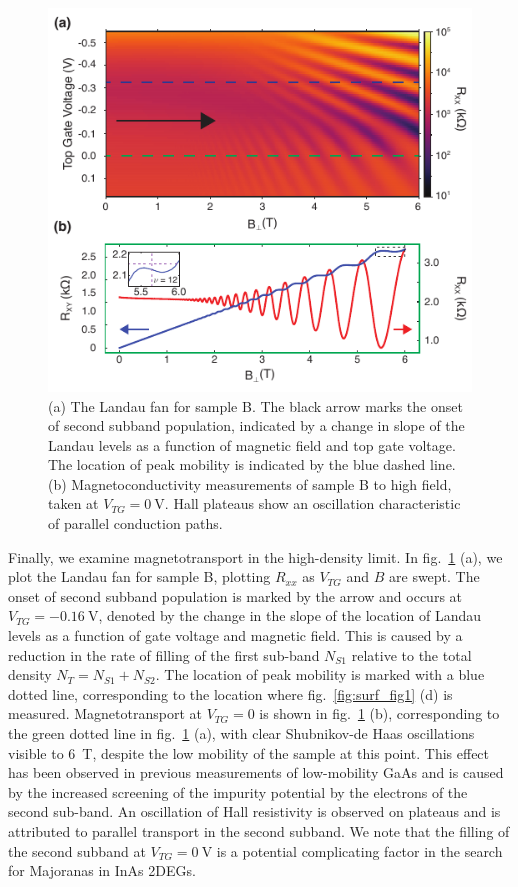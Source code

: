 \begin{figure}
    \includegraphics[width=0.6\linewidth]{Figure5}
    \caption{\label{fig:surf_fig5}(a) The Landau fan for sample B. The black arrow marks the onset of second subband population, indicated by a change in slope of the Landau levels as a function of magnetic field and top gate voltage. The location of peak mobility is indicated by the blue dashed line. (b) Magnetoconductivity measurements of sample B to high field, taken at $V_{TG} = \SI{0}{\volt}$. Hall plateaus show an oscillation characteristic of parallel conduction paths.}
\end{figure}

Finally, we examine magnetotransport in the high-density limit. In fig.~\ref{fig:surf_fig5} (a), we plot the Landau fan for sample B, plotting $R_{xx}$ as $V_{TG}$ and $B$ are swept. The onset of second subband population is marked by the arrow and occurs at $V_{TG} = \SI{-0.16}{\volt}$, denoted by the change in the slope of the location of Landau levels as a function of gate voltage and magnetic field\cite{PhysRevB.74.195313,STORMER1982707}. This is caused by a reduction in the rate of filling of the first sub-band $N_{S1}$ relative to the total density $N_T = N_{S1} + N_{S2}$. The location of peak mobility is marked with a blue dotted line, corresponding to the location where fig.~\ref{fig:surf_fig1} (d) is measured. Magnetotransport at $V_{TG} = 0$ is shown in fig.~\ref{fig:surf_fig5} (b), corresponding to the green dotted line in fig.~\ref{fig:surf_fig5} (a), with clear Shubnikov-de Haas oscillations visible to \SI{6}{\tesla}, despite the low mobility of the sample at this point. This effect has been observed in previous measurements of low-mobility GaAs and is caused by the increased screening of the impurity potential by the electrons of the second sub-band\cite{PhysRevB.38.7866}. An oscillation of Hall resistivity is observed on plateaus and is attributed to parallel transport in the second subband. We note that the filling of the second subband at $V_{TG} = \SI{0}{\volt}$ is a potential complicating factor in the search for Majoranas in InAs 2DEGs\cite{s41578-018-0003-1}.

